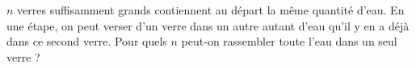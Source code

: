 $n$ verres suffisamment grands contiennent au départ la même quantité d'eau. En une étape, on peut verser d'un verre dans un autre autant d'eau qu'il y en a déjà dans ce second verre. Pour quels $n$ peut-on rassembler toute l'eau dans un seul verre ?
